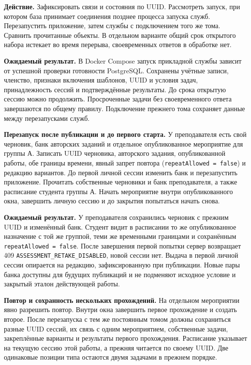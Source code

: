 \documentclass[12pt,a4paper]{article}
\begin{document}
\textbf{Действие.} Зафиксировать связи и состояния по UUID. Рассмотреть запуск, при котором база принимает соединения позднее процесса запуска служб. Перезапустить приложение, затем службы с подключением того же тома. Сравнить прочитанные объекты. В отдельном варианте общий срок открытого набора истекает во время перерыва, своевременных ответов в обработке нет.

\textbf{Ожидаемый результат.} В Docker Compose запуск прикладной службы зависит от успешной проверки готовности PostgreSQL. Сохранены учётные записи, членство, признаки включения шаблонов, UUID и условия задач, принадлежность сессий и подтверждённые результаты. До срока открытую сессию можно продолжить. Просроченные задачи без своевременного ответа завершаются по общему правилу. Подключение прежнего тома сохраняет данные между перезапусками служб.

\textbf{Перезапуск после публикации и до первого старта.} У преподавателя есть свой черновик, банк авторских заданий и отдельное опубликованное мероприятие для группы А. Записать UUID черновика, авторского задания, опубликованной работы, обе границы времени, явный запрет повтора (\texttt{repeat\allowbreak{}Allowed =\allowbreak{} false}) и редакцию вариантов. До первой личной сессии изменить банк и перезапустить приложение. Прочитать собственные черновики и банк преподавателя, а также расписание студента группы А. Начать мероприятие внутри опубликованного окна, завершить личную сессию и до закрытия попытаться начать снова.

\textbf{Ожидаемый результат.} У преподавателя сохранились черновик с прежним UUID и изменённый банк. Студент видит в расписании то же опубликованное назначение с той же группой, теми же временными границами и сохранённым \texttt{repeat\allowbreak{}Allowed =\allowbreak{} false}. После завершения первой попытки сервер возвращает 409 \texttt{ASSESSMENT\_\allowbreak{}RETAKE\_\allowbreak{}DISABLED}, новой сессии нет. Выдача в первой личной сессии опирается на редакцию, зафиксированную при публикации. Новые пары банка доступны для будущих публикаций и не подменяют исходное условие и закрытый эталон действующей работы.

\textbf{Повтор и сохранность нескольких прохождений.} На отдельном мероприятии явно разрешить повтор. Внутри окна завершить первое прохождение и создать второе. После перезапуска с тем же постоянным томом должны сохраниться разные UUID сессий, их связь с одним мероприятием, собственные задачи, закреплённые варианты и результаты первого прохождения. Расписание указывает на текущую сессию этой работы, а прежняя читается по своему UUID. Две одинаковые позиции типа остаются двумя задачами в прежнем порядке.
\end{document}
